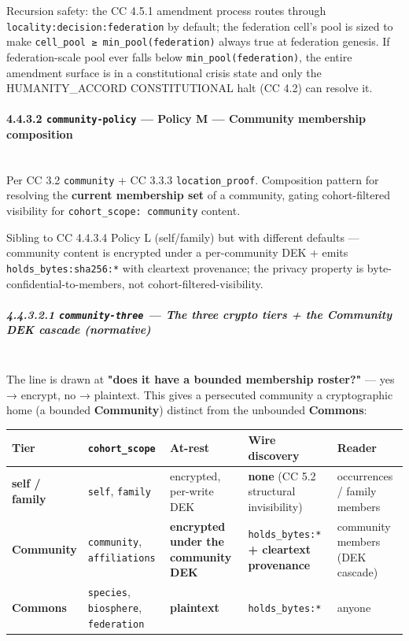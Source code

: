 \documentclass[11pt]{article}
\begin{document}
Recursion safety: the CC 4.5.1 amendment process routes through \texttt{locality:decision:federation} by default; the federation cell's pool is sized to make \texttt{cell\_pool ≥ min\_pool(federation)} always true at federation genesis. If federation-scale pool ever falls below \texttt{min\_pool(federation)}, the entire amendment surface is in a constitutional crisis state and only the HUMANITY\_ACCORD CONSTITUTIONAL halt (CC 4.2) can resolve it.


\paragraph{4.4.3.2 \texttt{community-policy} — Policy M — Community membership composition}\mbox{}\\


Per CC 3.2 \texttt{community} + CC 3.3.3 \texttt{location\_proof}. Composition pattern for resolving the \textbf{current membership set} of a community, gating cohort-filtered visibility for \texttt{cohort\_scope: community} content.


Sibling to CC 4.4.3.4 Policy L (self/family) but with different defaults — community content is encrypted under a per-community DEK + emits \texttt{holds\_bytes:sha256:*} with cleartext provenance; the privacy property is byte-confidential-to-members, not cohort-filtered-visibility.


\subparagraph{4.4.3.2.1 \texttt{community-three} — The three crypto tiers + the Community DEK cascade (normative)}\mbox{}\\


The line is drawn at \textbf{"does it have a bounded membership roster?"} — yes → encrypt, no → plaintext. This gives a persecuted community a cryptographic home (a bounded \textbf{Community}) distinct from the unbounded \textbf{Commons}:


{\scriptsize
\begin{longtable}{|p{3.2cm}|p{3.2cm}|p{3.2cm}|p{3.2cm}|p{3.2cm}|}\hline
\textbf{Tier} & \textbf{\texttt{cohort\_scope}} & \textbf{At-rest} & \textbf{Wire discovery} & \textbf{Reader} \\ \hline\endhead
\textbf{self / family} & \texttt{self}, \texttt{family} & encrypted, per-write DEK & \textbf{none} (CC 5.2 structural invisibility) & occurrences / family members \\ \hline
\textbf{Community} & \texttt{community}, \texttt{affiliations} & \textbf{encrypted under the community DEK} & \texttt{holds\_bytes:*} \textbf{+ cleartext provenance} & community members (DEK cascade) \\ \hline
\textbf{Commons} & \texttt{species}, \texttt{biosphere}, \texttt{federation} & \textbf{plaintext} & \texttt{holds\_bytes:*} & anyone \\ \hline
\end{longtable}}
\end{document}
